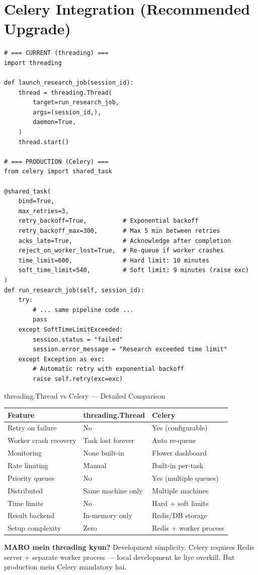 \documentclass[11pt,a4paper,twoside]{report}
\begin{document}
\section{Celery Integration (Recommended Upgrade)}

\begin{lstlisting}[style=pythonstyle,caption={How services.py would change with Celery}]
# === CURRENT (threading) ===
import threading

def launch_research_job(session_id):
    thread = threading.Thread(
        target=run_research_job,
        args=(session_id,),
        daemon=True,
    )
    thread.start()

# === PRODUCTION (Celery) ===
from celery import shared_task

@shared_task(
    bind=True,
    max_retries=3,
    retry_backoff=True,          # Exponential backoff
    retry_backoff_max=300,       # Max 5 min between retries
    acks_late=True,              # Acknowledge after completion
    reject_on_worker_lost=True,  # Re-queue if worker crashes
    time_limit=600,              # Hard limit: 10 minutes
    soft_time_limit=540,         # Soft limit: 9 minutes (raise exc)
)
def run_research_job(self, session_id):
    try:
        # ... same pipeline code ...
        pass
    except SoftTimeLimitExceeded:
        session.status = "failed"
        session.error_message = "Research exceeded time limit"
    except Exception as exc:
        # Automatic retry with exponential backoff
        raise self.retry(exc=exc)
\end{lstlisting}

\begin{conceptbox}{threading.Thread vs Celery --- Detailed Comparison}
\begin{longtable}{|p{3cm}|p{4cm}|p{5.5cm}|}
\hline
\textbf{Feature} & \textbf{threading.Thread} & \textbf{Celery} \\
\hline
Retry on failure & No & Yes (configurable) \\
\hline
Worker crash recovery & Task lost forever & Auto re-queue \\
\hline
Monitoring & None built-in & Flower dashboard \\
\hline
Rate limiting & Manual & Built-in per-task \\
\hline
Priority queues & No & Yes (multiple queues) \\
\hline
Distributed & Same machine only & Multiple machines \\
\hline
Time limits & No & Hard + soft limits \\
\hline
Result backend & In-memory only & Redis/DB storage \\
\hline
Setup complexity & Zero & Redis + worker process \\
\hline
\end{longtable}

\textbf{MARO mein threading kyun?} Development simplicity. Celery requires Redis server + separate worker process --- local development ke liye overkill. But production mein Celery mandatory hai.
\end{conceptbox}
\end{document}
